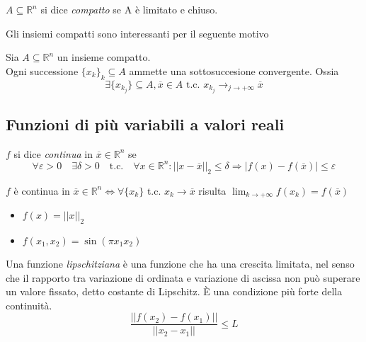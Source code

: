 \begin{defn}
 $A \subseteq \mathbb{R}^{n}$ si dice \emph{compatto} se A è limitato e chiuso.
\end{defn}
Gli insiemi compatti sono interessanti per il seguente motivo

\begin{theo}
\label{richiamibigi:bolzanow01}
 Sia $A \subseteq \mathbb{R}^{n}$ un insieme compatto.\\
 Ogni successione  $\{x_k\}_{k} \subseteq A$ ammette una sottosuccesione
 convergente.  Ossia
$$ \exists \{ x_{k_{j}}\} \subseteq A, \overline{x} \in A \text{ t.c. } x_{k_j} \rightarrow_{j \to + \infty} \overline{x}$$
\end{theo}

\subsection{Funzioni di pi\`u variabili a valori reali}%

\begin{defn}
 $f$ si dice \emph{continua} in $\overline{x} \in \mathbb{R}^{n}$ se
 $$ \forall \varepsilon > 0 \quad \exists \delta > 0  \quad  \text{t.c.} \quad
\forall x \in \mathbb{R}^{n} : || x-\overline{x} ||_{2} \leq \delta  \Rightarrow | f(x) - f(\overline{x})| \leq \varepsilon $$ 
\end{defn}

\begin{property}
\label{richiamibigi:propfunzcont}
$f$ è continua in $\overline{x} \in \mathbb{R}^{n} \Longleftrightarrow
\forall \{x_k\}$ t.c. $x_k \rightarrow \overline{x}$ risulta 
$ \displaystyle \lim_{k \to +\infty}f(x_k) = f(\overline{x})$
\end{property}


\begin{example}
  \begin{itemize}
  \item  $f(x) = || x ||_{2}$
  \item $f(x_1,x_2) = \sin(\pi x_1x_2)$
  \end{itemize}
\end{example}

\begin{defn}[Lipschitziana]
\label{def:lipschitziana}
Una funzione \emph{lipschitziana} è una funzione che ha una crescita
limitata, nel senso che il rapporto tra variazione di ordinata e
variazione di ascissa non può superare un valore fissato, detto
costante di Lipschitz. È una condizione più forte della continuità.
$$ \frac{||f(x_2) - f(x_1)||}{|| x_2 - x_1 ||} \leq L $$
\end{defn}


